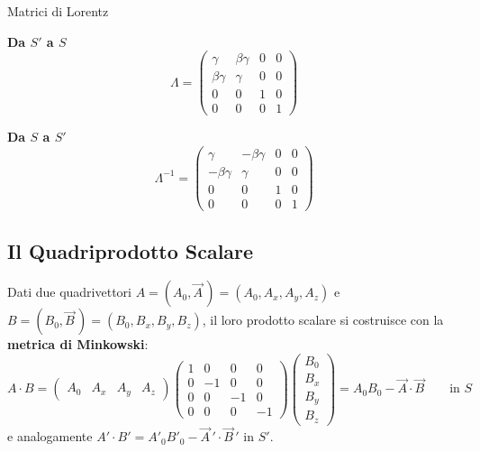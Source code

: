 \begin{formulario}{Matrici di Lorentz}
\begin{minipage}[t]{0.47\textwidth}
\centering \textbf{Da $S'$ a $S$}
\begin{equation*}
    \Lambda =
    \begin{pmatrix}
        \gamma & \beta\gamma & 0 & 0 \\
        \beta\gamma & \gamma & 0 & 0 \\
        0 & 0 & 1 & 0 \\
        0 & 0 & 0 & 1
    \end{pmatrix}
\end{equation*}
\end{minipage}
\hfill
\begin{minipage}[t]{0.47\textwidth}
\centering \textbf{Da $S$ a $S'$}
\begin{equation*}
    \Lambda^{-1} =
    \begin{pmatrix}
        \gamma & -\beta\gamma & 0 & 0 \\
        -\beta\gamma & \gamma & 0 & 0 \\
        0 & 0 & 1 & 0 \\
        0 & 0 & 0 & 1
    \end{pmatrix}
\end{equation*}
\end{minipage}
\vspace{4pt}
\end{formulario}

\subsection{Il Quadriprodotto Scalare}

Dati due quadrivettori $A = (A_0, \vec{A}\,) = (A_0, A_x, A_y, A_z)$ e $B = (B_0, \vec{B}\,) = (B_0, B_x, B_y, B_z)$, il loro prodotto scalare si costruisce con la \textbf{metrica di Minkowski}:
\begin{equation}
    A \cdot B =
    \begin{pmatrix} A_0 & A_x & A_y & A_z \end{pmatrix}
    \begin{pmatrix}
        1 & 0 & 0 & 0 \\
        0 & -1 & 0 & 0 \\
        0 & 0 & -1 & 0 \\
        0 & 0 & 0 & -1
    \end{pmatrix}
    \begin{pmatrix} B_0 \\ B_x \\ B_y \\ B_z \end{pmatrix}
    = A_0 B_0 - \vec{A} \cdot \vec{B}
    \qquad \text{in } S
\end{equation}
e analogamente $A' \cdot B' = A'_0 B'_0 - \vec{A}\,' \cdot \vec{B}\,'$ in $S'$.

